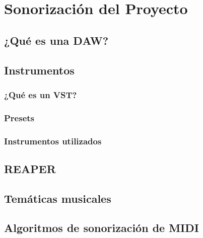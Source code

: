 \chapter{Sonorización del Proyecto}

\section{¿Qué es una DAW?}
\section{Instrumentos}

\subsection{¿Qué es un VST?}

\subsection{Presets}

\subsection{Instrumentos utilizados}

\section{REAPER}

\section{Temáticas musicales}

\section{Algoritmos de sonorización de MIDI}


